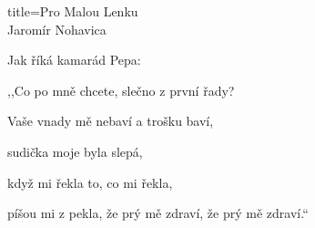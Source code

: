 \begin{song}{title=\predtitle\centering Pro Malou Lenku \\\large Jaromír Nohavica  \vspace*{-0.3cm}}
\begin{centerjustified}
\sloka
Jak říká kamarád Pepa:

,,Co po mně chcete, slečno z první řady?

Vaše vnady mě nebaví a trošku baví,

sudička moje byla slepá,

když mi řekla to, co mi řekla,

píšou mi z pekla, že prý mě zdraví, že prý mě zdraví.``




\end{centerjustified}
\setcounter{Slokočet}{0}
\end{song}
